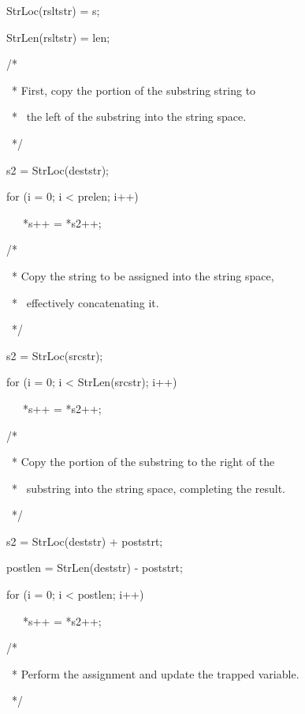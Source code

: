 {\ttfamily\mdseries
\ \ \ StrLoc(rsltstr) = s;}

{\ttfamily\mdseries
\ \ \ StrLen(rsltstr) = len;}

{\ttfamily\mdseries
\ \ \ /*}

{\ttfamily\mdseries
\ \ \ \ * First, copy the portion of the substring string to}

{\ttfamily\mdseries
\ \ \ \ * \ the left of the substring into the string space.}

{\ttfamily\mdseries
\ \ \ \ */}

{\ttfamily\mdseries
\ \ \ s2 = StrLoc(deststr);}

{\ttfamily\mdseries
\ \ \ for (i = 0; i {\textless} prelen; i++)}

{\ttfamily\mdseries
\ \ \ \ \ \ *s++ = *s2++;}

{\ttfamily\mdseries
\ \ \ /*}

{\ttfamily\mdseries
\ \ \ \ * Copy the string to be assigned into the string space,}

{\ttfamily\mdseries
\ \ \ \ * \ effectively concatenating it.}

{\ttfamily\mdseries
\ \ \ \ */}

{\ttfamily\mdseries
\ \ \ s2 = StrLoc(srcstr);}

{\ttfamily\mdseries
\ \ \ for (i = 0; i {\textless} StrLen(srcstr); i++)}

{\ttfamily\mdseries
\ \ \ \ \ \ *s++ = *s2++;}

{\ttfamily\mdseries
\ \ \ /*}

{\ttfamily\mdseries
\ \ \ \ * Copy the portion of the substring to the right of the}

{\ttfamily\mdseries
\ \ \ \ * \ substring into the string space, completing the result.}

{\ttfamily\mdseries
\ \ \ \ */}

{\ttfamily\mdseries
\ \ \ s2 = StrLoc(deststr) + poststrt;}

{\ttfamily\mdseries
\ \ \ postlen = StrLen(deststr) - poststrt;}

{\ttfamily\mdseries
\ \ \ for (i = 0; i {\textless} postlen; i++)}

{\ttfamily\mdseries
\ \ \ \ \ \ *s++ = *s2++;}


\bigskip

{\ttfamily\mdseries
\ \ \ /*}

{\ttfamily\mdseries
\ \ \ \ * Perform the assignment and update the trapped variable.}

{\ttfamily\mdseries
\ \ \ \ */}

